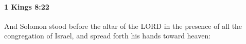 
		\paragraph{1 Kings 8:22} %
			\label{1KINGS-8-22}

			And Solomon stood before the altar of the LORD in the presence of all the congregation of Israel, and spread forth his hands toward heaven:


